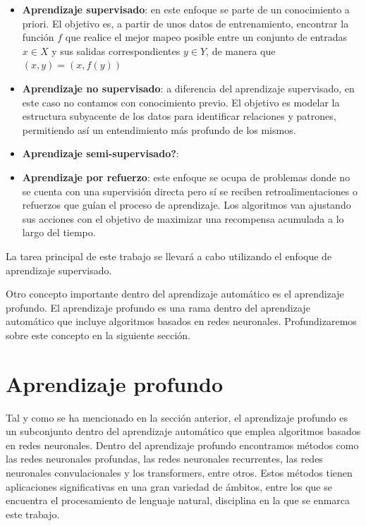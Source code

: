 \documentclass[11pt,spanish,listoffigures,listoftables]{tfgetsinf}
\begin{document}
\begin{itemize}
\item \textbf{Aprendizaje supervisado}: en este enfoque se parte de un conocimiento a priori. El objetivo es, a partir de unos datos de entrenamiento, encontrar la función $f$ que realice el mejor mapeo posible entre un conjunto de entradas $x \in X$ y sus salidas correspondientes $y \in Y$, de manera que $(x, y) = (x, f(y))$
\item \textbf{Aprendizaje no supervisado}: a diferencia del aprendizaje supervisado, en este caso no contamos con conocimiento previo. El objetivo es modelar la estructura subyacente de los datos para identificar relaciones y patrones, permitiendo así un entendimiento más profundo de los mismos.
\item \textbf{Aprendizaje semi-supervisado?}:
\item \textbf{Aprendizaje por refuerzo}: este enfoque se ocupa de problemas donde no se cuenta con una supervisión directa pero sí se reciben retroalimentaciones o refuerzos que guían el proceso de aprendizaje. Los algoritmos van ajustando sus acciones con el objetivo de maximizar una recompensa acumulada a lo largo del tiempo.
\end{itemize}

La tarea principal de este trabajo se llevará a cabo utilizando el enfoque de aprendizaje supervisado. 

Otro concepto importante dentro del aprendizaje automático es el aprendizaje profundo. El aprendizaje profundo es una rama dentro del aprendizaje automático que incluye algoritmos basados en redes neuronales. Profundizaremos sobre este concepto en la siguiente sección.

\section{Aprendizaje profundo}

Tal y como se ha mencionado en la sección anterior, el aprendizaje profundo es un subconjunto dentro del aprendizaje automático que emplea algoritmos basados en redes neuronales. Dentro del aprendizaje profundo encontramos métodos como las redes neuronales profundas, las redes neuronales recurrentes, las redes neuronales convulacionales y los transformers, entre otros. Estos métodos tienen aplicaciones significativas en una gran variedad de ámbitos, entre los que se encuentra el procesamiento de lenguaje natural, disciplina en la que se enmarca este trabajo.
\end{document}
